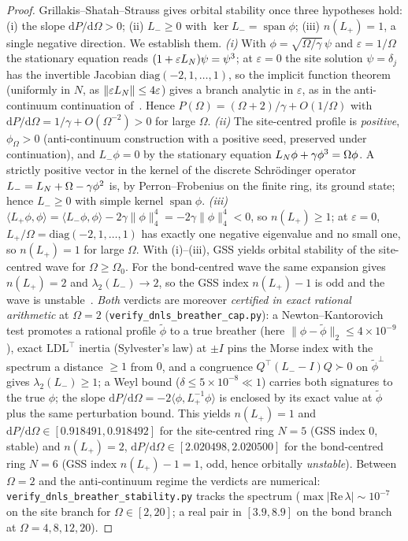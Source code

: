 \begin{proof}
Grillakis--Shatah--Strauss gives orbital stability once three hypotheses hold: (i) the slope
$\mathrm dP/\mathrm d\Omega>0$; (ii) $L_-\ge0$ with $\ker L_-=\operatorname{span}\phi$; (iii) $n(L_+)=1$, a
single negative direction. We establish them.
\emph{(i)} With $\phi=\sqrt{\Omega/\gamma}\,\psi$ and $\varepsilon=1/\Omega$ the stationary equation reads
$(1+\varepsilon L_N)\psi=\psi^3$; at $\varepsilon=0$ the site solution $\psi=\delta_{j}$ has the invertible
Jacobian $\mathrm{diag}(-2,1,\dots,1)$, so the implicit function theorem (uniformly in $N$, as
$\|\varepsilon L_N\|\le4\varepsilon$) gives a branch analytic in $\varepsilon$, as in the anti-continuum
continuation of~\cite{MacKayAubry}. Hence $P(\Omega)=(\Omega+2)/\gamma+O(1/\Omega)$ with
$\mathrm dP/\mathrm d\Omega=1/\gamma+O(\Omega^{-2})>0$ for large $\Omega$.
\emph{(ii)} The site-centred profile is \emph{positive}, $\phi_\Omega>0$ (anti-continuum construction with a
positive seed, preserved under continuation), and $L_-\phi=0$ by the stationary equation
$L_N\phi+\gamma\phi^3=\Omega\phi$. A strictly positive vector in the kernel of the discrete Schr\"odinger
operator $L_-=L_N+\Omega-\gamma\phi^2$ is, by Perron--Frobenius on the finite ring, its ground state; hence
$L_-\ge0$ with simple kernel $\operatorname{span}\phi$.
\emph{(iii)} $\langle L_+\phi,\phi\rangle=\langle L_-\phi,\phi\rangle-2\gamma\|\phi\|_4^4=-2\gamma\|\phi\|_4^4<0$,
so $n(L_+)\ge1$; at $\varepsilon=0$, $L_+/\Omega=\mathrm{diag}(-2,1,\dots,1)$ has exactly one negative
eigenvalue and no small one, so $n(L_+)=1$ for large $\Omega$. With (i)--(iii), GSS yields orbital stability
of the site-centred wave for $\Omega\ge\Omega_0$. For the bond-centred wave the same expansion gives
$n(L_+)=2$ and $\lambda_2(L_-)\to2$, so the GSS index $n(L_+)-1$ is odd and the wave is
unstable~\cite{GSS2}. \emph{Both} verdicts are moreover \emph{certified in exact rational arithmetic} at
$\Omega=2$ (\texttt{verify\_dnls\_breather\_cap.py}): a Newton--Kantorovich
test promotes a rational profile $\tilde\phi$ to a true breather (here $\|\phi-\tilde\phi\|_2\le4\times10^{-9}$),
exact $\mathrm{LDL}^\top$ inertia (Sylvester's law) at $\pm I$ pins the Morse index with the spectrum a distance
$\ge1$ from $0$, and a congruence $Q^\top(L_--I)Q\succ0$ on $\tilde\phi^\perp$ gives $\lambda_2(L_-)\ge1$; a
Weyl bound ($\delta\le5\times10^{-8}\ll1$) carries both signatures to the true $\phi$; the slope
$\mathrm dP/\mathrm d\Omega=-2\langle\phi,L_+^{-1}\phi\rangle$ is enclosed by its exact value at $\tilde\phi$
plus the same perturbation bound. This yields $n(L_+)=1$ and $\mathrm dP/\mathrm d\Omega\in[0.918491,0.918492]$
for the site-centred ring $N=5$ (GSS index $0$, stable) and $n(L_+)=2$,
$\mathrm dP/\mathrm d\Omega\in[2.020498,2.020500]$ for the bond-centred ring $N=6$ (GSS index $n(L_+)-1=1$,
odd, hence orbitally \emph{unstable}). Between $\Omega=2$ and the anti-continuum regime the verdicts are
numerical: \texttt{verify\_dnls\_breather\_stability.py} tracks the spectrum
($\max|\mathrm{Re}\,\lambda|\sim10^{-7}$ on the site branch for $\Omega\in[2,20]$; a real pair in $[3.9,8.9]$ on
the bond branch at $\Omega=4,8,12,20$). \end{proof}

